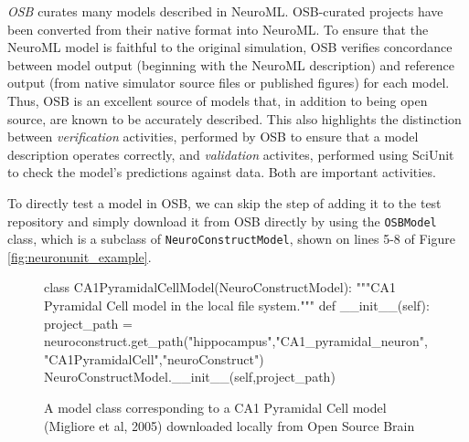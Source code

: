 \documentclass{frontiersSCNS}
\let\verbx\lstinline
\begin{document}
\textit{OSB} curates many models described in NeuroML. 
OSB-curated projects have been converted from their native format into NeuroML. To ensure that the NeuroML model is faithful to the original simulation, OSB verifies concordance between model output (beginning with the NeuroML description) and reference output (from native simulator source files or published figures) for each model. 
Thus, OSB is an excellent source of models that, in addition to being open source, are known to be accurately described. This also highlights the distinction between \emph{verification} activities, performed by OSB to ensure that a model description operates correctly, and \emph{validation} activites, performed using SciUnit to check the model's predictions against data. Both are important activities.

To directly test a model in OSB, we can skip the step of adding it to the test repository and simply download it from OSB directly by using the \verbx{OSBModel} class, which is a subclass of  \verbx{NeuroConstructModel}, shown on lines 5-8 of Figure \ref{fig:neuronunit_example}. 


\begin{figure}
\begin{python}
class CA1PyramidalCellModel(NeuroConstructModel):
	"""CA1 Pyramidal Cell model in the local file system."""
	def __init__(self):
		project_path = neuroconstruct.get_path("hippocampus","CA1_pyramidal_neuron","CA1PyramidalCell","neuroConstruct")
		NeuroConstructModel.__init__(self,project_path)
\end{python}
\vspace{-15px}
\caption{A model class corresponding to a CA1 Pyramidal Cell model (Migliore et al, 2005) downloaded locally from Open Source Brain}
\label{fig:ca1_model}
\vspace{-10px}
\end{figure}
\end{document}
